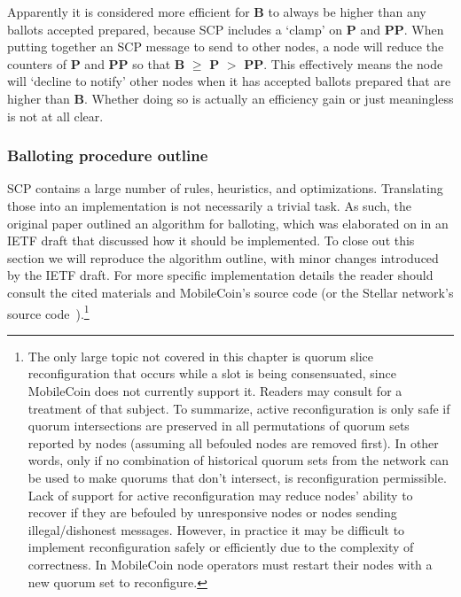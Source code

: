 \begin{enumerate}
    Apparently it is considered more efficient for \textbf{B} to always be higher than any ballots accepted prepared, because SCP includes a `clamp' on \textbf{P} and \textbf{PP}. When putting together an SCP message to send to other nodes, a node will reduce the counters of \textbf{P} and \textbf{PP} so that \textbf{B} $\geq$ \textbf{P} $>$ \textbf{PP}. This effectively means the node will `decline to notify' other nodes when it has accepted ballots prepared that are higher than \textbf{B}. Whether doing so is actually an efficiency gain or just meaningless is not at all clear.
\end{enumerate}

\subsubsection{Balloting procedure outline}

SCP contains a large number of rules, heuristics, and optimizations. Translating those into an implementation is not necessarily a trivial task. As such, the original paper \cite{stellar-consensus-protocol} outlined an algorithm for balloting, which was elaborated on in an IETF draft \cite{scp-ietf-draft} that discussed how it should be implemented. To close out this section we will reproduce the algorithm outline, with minor changes introduced by the IETF draft. For more specific implementation details the reader should consult the cited materials and MobileCoin's source code \cite{mobilecoin-source-code} (or the Stellar network's source code~\cite{stellar-network-source-code}).\footnote{The only large topic not covered in this chapter is quorum slice reconfiguration that occurs while a slot is being consensuated, since MobileCoin does not currently support it. Readers may consult \cite{stellar-consensus-protocol} for a treatment of that subject. To summarize, active reconfiguration is only safe if quorum intersections are preserved in all permutations of quorum sets reported by nodes (assuming all befouled nodes are removed first). In other words, only if no combination of historical quorum sets from the network can be used to make quorums that don't intersect, is reconfiguration permissible. Lack of support for active reconfiguration may reduce nodes' ability to recover if they are befouled by unresponsive nodes or nodes sending illegal/dishonest messages. However, in practice it may be difficult to implement reconfiguration safely or efficiently due to the complexity of correctness. In MobileCoin node operators must restart their nodes with a new quorum set to reconfigure.}

